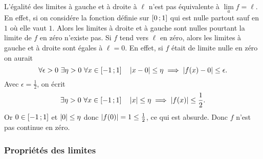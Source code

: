 L'égalité des limites à gauche et à droite à $\ell$ n'est pas équivalente à $\lim\limits_{a}f=\ell$. En effet, si on considére la fonction définie sur $\left[ 0 \, ;  1 \right]$ qui est nulle partout sauf en $1$ où elle vaut $1$. Alors les limites à droite et à gauche sont nulles pourtant la limite de $f$ en zéro n'existe pas. Si $f$ tend vers $\ell$ en zéro, alors les limites à gauche et à droite sont égales à $\ell=0$. En effet, si $f$ était de limite nulle en zéro on aurait
\begin{equation}
  \forall \epsilon > 0 \ \exists \eta > 0 \ \forall x \in \intervalleff{-1}{1} \quad \abs{x-0} \leq \eta \implies \abs{f(x)-0} \leq \epsilon.
\end{equation}
Avec $\epsilon=\frac{1}{2}$, on écrit
\begin{equation}
  \exists \eta > 0 \ \forall x \in \left[ -1 \, ;  1 \right] \quad \left\lvert x\right\rvert\leq \eta \implies \left\lvert f(x)\right\rvert \leq \frac{1}{2}.
\end{equation}
Or $0 \in \left[ -1 \, ;  1 \right]$ et $\left\lvert0\right\rvert\leq \eta$ donc $\left\lvert f(0)\right\rvert=1 \leq \frac{1}{2}$, ce qui est absurde. Donc $f$ n'est pas continue en zéro.

\subsubsection{Propriétés des limites}

